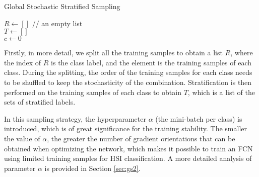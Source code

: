 \documentclass[journal]{IEEEtran}
\begin{document}
\begin{algorithm}[t]
  \caption{Global Stochastic Stratified Sampling\label{alg:sss}}
  $R \gets [] $ // an empty list \\
  $T \gets []$ \\
  $c \gets 0$ \\
\end{algorithm}

Firstly, in more detail, we split all the training samples to obtain a list $R$, where the index of $R$ is the class label, and the element is the training samples of each class.
During the splitting, the order of the training samples for each class needs to be shuffled to keep the stochasticity of the combination.
Stratification is then performed on the training samples of each class to obtain $T$, which is a list of the sets of stratified labels.

In this sampling strategy, the hyperparameter $\alpha$ (the mini-batch per class) is introduced, which is of great significance for the training stability.
The smaller the value of $\alpha$, the greater the number of gradient orientations that can be obtained when optimizing the network, which makes it possible to train an FCN using limited training samples for HSI classification.
A more detailed analysis of parameter $\alpha$ is provided in Section \ref{sec:gs2}.
\end{document}
